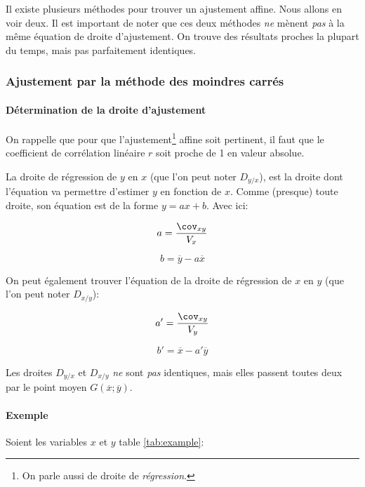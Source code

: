 \documentclass[a4paper,12pt]{scrartcl}
\begin{document}
Il existe plusieurs méthodes pour trouver un ajustement affine. Nous allons en voir deux. Il est important de noter que ces deux méthodes \emph{ne} mènent \emph{pas} à la même équation de droite d'ajustement. On trouve des résultats proches la plupart du temps, mais pas parfaitement identiques. 

\subsubsection{Ajustement par la méthode des moindres carrés} 

\paragraph{Détermination de la droite d'ajustement}
On rappelle que pour que l'ajustement\footnote{On parle aussi de droite de \emph{régression}.} affine soit pertinent, il faut que le coefficient de corrélation linéaire $r$ soit proche de 1 en valeur absolue. 

La droite de régression de $y$ en $x$ (que l'on peut noter $D_{y/x}$), est la droite dont l'équation va permettre d'estimer $y$ en fonction de $x$. Comme (presque) toute droite, son équation est de la forme $y=ax+b$. Avec ici:

\begin{equation}
    a = \frac{\cov_{xy}}{V_x} 
    \label{eq:a}
\end{equation}

\begin{equation}
    b = \overline{y} - a \overline{x}
    \label{eq:b}
\end{equation}

On peut également trouver l'équation de la droite de régression de $x$ en $y$ (que l'on peut noter $D_{x/y}$):

\begin{equation}
    a' = \frac{\cov_{xy}}{V_y} 
    \label{eq:a2}
\end{equation}

\begin{equation}
    b' = \overline{x} - a' \overline{y}
    \label{eq:b2}
\end{equation}

Les droites $D_{y/x}$ et $D_{x/y}$ \emph{ne} sont \emph{pas} identiques, mais elles passent toutes deux par le point moyen $G(\overline{x};\overline{y})$.

\paragraph{Exemple}
Soient les variables $x$ et $y$ table \ref{tab:example}:
\end{document}
